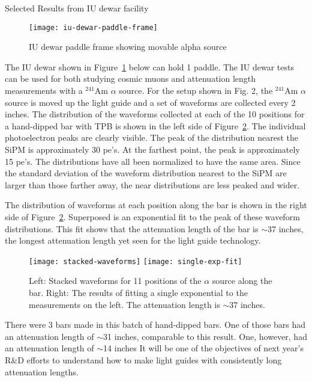 Selected Results from IU dewar facility

\begin{figure}[htbp]
\centering
\texttt{[image: iu-dewar-paddle-frame]}
\caption{IU dewar paddle frame showing movable alpha source}
\label{fig:iu-dewar-paddle-frame}
\end{figure}

The IU dewar shown in Figure~\ref{fig:iu-dewar-paddle-frame} below can hold 1 paddle.  The IU dewar tests can be used for both studying cosmic muons and attenuation length measurements with a $^{241}$Am $\alpha$ source.  For the setup shown in Fig. 2, the $^{241}$Am $\alpha$ source is moved up the light guide and a set of waveforms are collected every 2 inches.  The distribution of the waveforms collected at each of the 10 positions for a hand-dipped bar with TPB is shown in the left side of Figure~\ref{fig:waveforms-and-fit}.  The individual photoelectron peaks are clearly visible.  The peak of the distribution nearest the SiPM is approximately 30 pe's.  At the farthest point, the peak is approximately 15 pe's.  The distributions have all been  normalized to have the same area.  Since the standard deviation of the waveform distribution nearest to the SiPM are larger than those farther away, the near distributions are less peaked and wider. 

The distribution of waveforms at each position along the bar is shown in the right side of Figure~\ref{fig:waveforms-and-fit}.  Superposed is an exponential fit to the peak of these waveform distributions.  This fit shows that the attenuation length of the bar is $\sim$37 inches, the longest attenuation length yet seen for the light guide technology. 
\begin{figure}[htbp]
\centering
\texttt{[image: stacked-waveforms]}
\texttt{[image: single-exp-fit]}
\caption{Left: Stacked waveforms for 11 positions of the $\alpha$ source along the bar. Right: The results of fitting a single exponential to the measurements on the left.  The attenuation length is $\sim$37 inches. }
\label{fig:waveforms-and-fit}
\end{figure}


There were 3 bars made in this batch of hand-dipped bars.  One of those bars had an attenuation length of $\sim$31 inches, comparable to this result.  One, however, had an attenuation length of $\sim$14 inches  It will be one of the objectives of next year's R\&D efforts to understand how to make light guides with consistently long attenuation lengths. 
 

